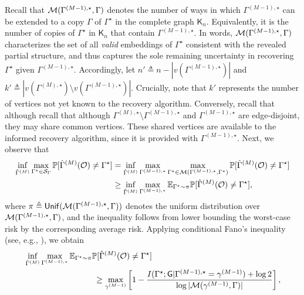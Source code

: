 \documentclass[12pt]{article}
\newcommand{\bE}{\mathbb{E}}
\newcommand {\pr} {\mathbb{P}}
\newcommand{\calM}{{\cal M}}
\newcommand{\calO}{{\cal O}}
\newcommand{\calS}{{\cal S}}
\newcommand{\pp}[1]{\left[#1\right]}
\newcommand{\s}[1]{\mathsf{#1}}
\begin{document}
Recall that $\calM(\Gamma^{(M-1),\star},\Gamma)$ denotes the number of ways in which $\Gamma^{(M-1),\star}$ can be extended to a copy $\Gamma$ of $\Gamma^\star$ in the complete graph $\s{K}_n$. Equivalently, it is the number of copies of $\Gamma^\star$ in $\s{K}_n$ that contain $\Gamma^{(M-1),\star}$. In words, $\calM(\Gamma^{(M-1),\star},\Gamma)$ characterizes the set of all \emph{valid} embeddings of $\Gamma^\star$ consistent with the revealed partial structure, and thus captures the sole remaining uncertainty in recovering $\Gamma^\star$ given $\Gamma^{(M-1),\star}$. Accordingly, let $n'\triangleq n-|v(\Gamma^{(M-1),\star})|$ and $k'\triangleq|v(\Gamma^{(M),\star})\setminus v(\Gamma^{(M-1),\star})|$. Crucially, note that $k'$ represents the number of vertices not yet known to the recovery algorithm. Conversely, recall that although recall that although $\Gamma^{(M),\star}\setminus\Gamma^{(M-1),\star}$ and $\Gamma^{(M-1),\star}$ are edge-disjoint, they may share common vertices. These shared vertices are available to the informed recovery algorithm, since it is provided with $\Gamma^{(M-1),\star}$. Next, we observe that
\begin{align}
    \inf_{\hat{\Gamma}^{(M)}}\max_{\Gamma^\star\in\calS_{\Gamma}}\pr[\hat{\Gamma}^{(M)}(\calO)\neq\Gamma^{\star}]
    &= \inf_{\hat{\Gamma}^{(M)}}\max_{\Gamma^{(M-1),\star}}\max_{\Gamma^{\star}\in\calM(\Gamma^{(M-1),\star},\Gamma^{\star})}\pr[\hat{\Gamma}^{(M)}(\calO)\neq\Gamma^{\star}]\\
    &\geq \inf_{\hat{\Gamma}^{(M)}}\max_{\Gamma^{(M-1),\star}}\bE_{\Gamma^{\star}\sim\pi}\pr[\hat{\Gamma}^{(M)}(\calO)\neq\Gamma^{\star}],
\end{align}
where $\pi \triangleq \s{Unif}(\calM(\Gamma^{(M-1),\star},\Gamma))$ denotes the uniform distribution over $\calM(\Gamma^{(M-1),\star},\Gamma)$, and the inequality follows from lower bounding the worst-case risk by the corresponding average risk. Applying conditional Fano's inequality (see, e.g., \cite[Theorem~3]{scarlett2021fano}), we obtain
\begin{align}
    &\inf_{\hat{\Gamma}^{(M)}}\max_{\Gamma^{(M-1),\star}}\bE_{\Gamma^{\star}\sim\pi}\pr[\hat{\Gamma}^{(M)}(\calO)\neq\Gamma^{\star}]\nonumber\\
    &\hspace{3cm}\geq 
    \max_{\gamma^{(M-1)}}\pp{1-\frac{I(\Gamma^\star; \s{G} \vert \Gamma^{(M-1),\star}=\gamma^{(M-1)}) + \log 2}{\log|\calM(\gamma^{(M-1)},\Gamma)|}},
    \label{eqn:fanoCond}
\end{align}
\end{document}
